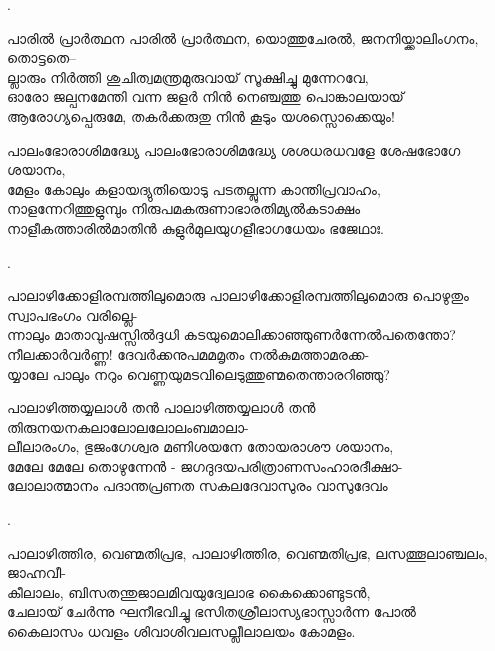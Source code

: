 \begin{enumerate}

.


\begin{slokam}{\VSv}{\UN}{പാരിൽ പ്രാർത്ഥന}
പാരിൽ പ്രാർത്ഥന, യൊത്തുചേരൽ, ജനനിയ്ക്കാലിംഗനം, തൊട്ടതെ--\\
ല്ലാരും നിർത്തി ശുചിത്വമന്ത്രമുരുവായ് സൂക്ഷിച്ചു മുന്നേറവേ,\\
ഓരോ ജല്പനമേന്തി വന്ന ജളർ നിൻ നെഞ്ചത്തു പൊങ്കാലയായ്\\
ആരോഗ്യപ്പെരുമേ, തകർക്കരുതു നിൻ കൂടും യശസ്സൊക്കെയും! 
\end{slokam}


\begin{slokam}{\VSr}{\Mazha}{പാലംഭോരാശിമദ്ധ്യേ}
 പാലംഭോരാശിമദ്ധ്യേ ശശധരധവളേ ശേഷഭോഗേ ശയാനം,\\
മേളം കോലും കളായദ്യുതിയൊടു പടതല്ലുന്ന കാന്തിപ്രവാഹം,\\
നാളന്നേറിത്തുളുമ്പും നിരുപമകരുണാഭാരതിമ്യൽകടാക്ഷം\\
നാളീകത്താരിൽമാതിൻ കുളുർമുലയുഗളീഭാഗധേയം ഭജേഥാഃ.
\end{slokam}


.


\begin{slokam}{\VSr}{\VKG}{പാലാഴിക്കോളിരമ്പത്തിലുമൊരു}
 പാലാഴിക്കോളിരമ്പത്തിലുമൊരു പൊഴുതും സ്വാപഭംഗം വരില്ലെ-\\
ന്നാലും മാതാവുഷസ്സിൽദ്ദധി കടയുമൊലിക്കാഞ്ഞുണർന്നേൽപതെന്തോ?\\
നീലക്കാർവർണ്ണ! ദേവർക്കനുപമമമൃതം നൽകുമത്താമരക്ക-\\
യ്യാലേ പാലും നറും വെണ്ണയുമടവിലെടുത്തുണ്മതെന്താരറിഞ്ഞു?
\end{slokam}


\begin{slokam}{\VSr}{\Punam}{പാലാഴിത്തയ്യലാള്‍ തൻ}
പാലാഴിത്തയ്യലാള്‍ തൻ തിരുനയനകലാലോലലോലംബമാലാ-\\
ലീലാരംഗം, ഭുജംഗേശ്വര മണിശയനേ തോയരാശൗ ശയാനം,\\
മേലേ മേലേ തൊഴുന്നേൻ - ജഗദുദയപരിത്രാണസംഹാരദീക്ഷാ-\\
ലോലാത്മാനം പദാന്തപ്രണത സകലദേവാസുരം വാസുദേവം
\end{slokam}


.

\begin{slokam}{\VSv}{\KJ}{പാലാഴിത്തിര, വെണ്മതിപ്രഭ,}
പാലാഴിത്തിര, വെണ്മതിപ്രഭ, ലസത്തൂലാഞ്ചലം, ജാഹ്നവീ-\\
കീലാലം, ബിസതന്തുജാലമിവയുദ്വേലാഭ കൈക്കൊണ്ടുടൻ, \\
ചേലായ് ചേർന്നു ഘനീഭവിച്ചു ഭസിതശ്രീലാസ്യഭാസ്സാർന്ന പോൽ \\
കൈലാസം ധവളം ശിവാശിവലസല്ലീലാലയം കോമളം.
\end{slokam}


\end{enumerate}
